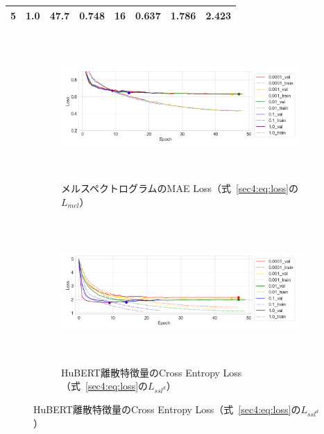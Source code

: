 \documentclass[12pt]{jarticle}
\numberwithin{equation}{section}    %
\numberwithin{figure}{section}      %
\numberwithin{table}{section}      %
\begin{document}
\begin{table}[bt]
\begin{center}
{\begin{tabular}{|c|l|rrrrrr|}
                5                        & 1.0                                      & 47.7                         & 0.748                     & 16                         & 0.637                         & 1.786                             & 2.423                    \\
                \hline
            \end{tabular}
        }
    \end{center}
\end{table}

\begin{figure}[bt]
    \centering
    \begin{subfigure}{\linewidth}
        \centering
        \includegraphics[height=55mm]{./figure/sec4/learning_curve/impact_of_loss_weights_across_methods/0/mel_loss.png}
        \caption{メルスペクトログラムのMAE Loss（式~\eqref{sec4:eq:loss}の$L_{mel}$）}
        \label{sec4:fig:learning_curve_method_1_val_mel_loss}
    \end{subfigure}
    \begin{subfigure}{\linewidth}
        \centering
        \includegraphics[height=55mm]{./figure/sec4/learning_curve/impact_of_loss_weights_across_methods/0/ssl_feature_cluster_loss.png}
        \caption{HuBERT離散特徴量のCross Entropy Loss（式~\eqref{sec4:eq:loss}の$L_{ssl^{d}}$）}
        \label{sec4:fig:learning_curve_method_1_val_ssl_feature_cluster_loss}
    \end{subfigure}

\end{figure}
\end{document}
